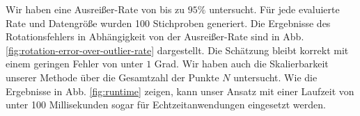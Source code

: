 Wir haben eine Ausreißer-Rate von bis zu $95\%$ untersucht. Für jede evaluierte Rate und Datengröße wurden 100 Stichproben generiert. Die Ergebnisse des Rotationsfehlers in Abhängigkeit von der Ausreißer-Rate sind in Abb. \ref{fig:rotation-error-over-outlier-rate} dargestellt. Die Schätzung bleibt korrekt mit einem geringen Fehler von unter $1$ Grad. Wir haben auch die Skalierbarkeit unserer Methode über die Gesamtzahl der Punkte $N$ untersucht. Wie die Ergebnisse in Abb. \ref{fig:runtime} zeigen, kann unser Ansatz mit einer Laufzeit von unter 100 Millisekunden sogar für Echtzeitanwendungen eingesetzt werden.
